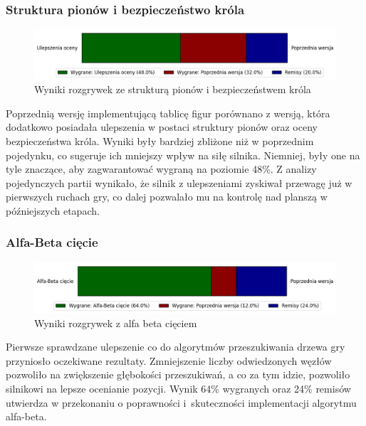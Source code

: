 \subsubsection{Struktura pionów i bezpieczeństwo króla}
\begin{figure}[ht]
    \centering
    \includegraphics[width=1\linewidth]{rozdzialy/rozdzial03/1_porownanie-wersji-silnika/rysunki/wyniki-full-eval}
    \caption{Wyniki rozgrywek ze strukturą pionów i bezpieczeństwem króla}
    \label{fig:wyniki-full-eval}
\end{figure}
Poprzednią wersję implementującą tablicę figur porównano z wersją, która dodatkowo posiadała ulepszenia w postaci struktury pionów oraz oceny bezpieczeństwa króla.
Wyniki były bardziej zbliżone niż w poprzednim pojedynku, co sugeruje ich mniejszy wpływ na siłę silnika.
Niemniej, były one na tyle znaczące, aby zagwarantować wygraną na poziomie 48\%.
Z analizy pojedynczych partii wynikało, że silnik z ulepszeniami zyskiwał przewagę już w pierwszych ruchach gry, co dalej pozwalało mu na kontrolę nad planszą w późniejszych etapach.


\subsubsection{Alfa-Beta cięcie}
\begin{figure}[ht]
    \centering
    \includegraphics[width=1\linewidth]{rozdzialy/rozdzial03/1_porownanie-wersji-silnika/rysunki/wyniki-alfa-beta}
    \caption{Wyniki rozgrywek z alfa beta cięciem}
    \label{fig:wyniki-alfa-beta}
\end{figure}
Pierwsze sprawdzane ulepszenie co do algorytmów przeszukiwania drzewa gry przyniosło oczekiwane rezultaty.
Zmniejszenie liczby odwiedzonych węzłów pozwoliło na zwiększenie głębokości przeszukiwań, a co za tym idzie, pozwoliło silnikowi na lepsze ocenianie pozycji.
Wynik 64\% wygranych oraz 24\% remisów utwierdza w przekonaniu o poprawności i~skuteczności implementacji algorytmu alfa-beta.


